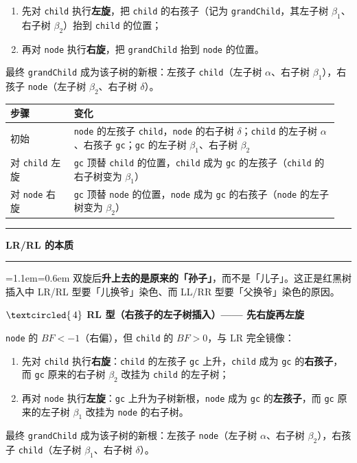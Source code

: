 \documentclass[11pt,openany,UTF8]{ctexbook}
\newcommand{\circled}[1]{\textcircled{\scriptsize\,#1}}
\newcommand{\callouthead}[2]{%
  \par\addvspace{7pt}\noindent
  {\color{#1}\rule[-0.15em]{3pt}{1.05em}}\hspace{0.5em}%
  {\bfseries\color{#1}#2}\par\nobreak\vspace{-0.35em}%
  {\color{rulesep}\hrule height 0.4pt}\nobreak\vspace{0.45em}%
  \begingroup\small\setlength{\parindent}{0pt}%
  \leftskip=1.1em\rightskip=0.6em\noindent\ignorespaces}
\newcommand{\calloutend}{\par\endgroup\addvspace{7pt}}
\newenvironment{callkey}[1]{\callouthead{keybar}{#1}}{\calloutend}
\begin{document}
\begin{enumerate}
\item 先对 \texttt{child} 执行\textbf{左旋}，把 \texttt{child} 的右孩子（记为 \texttt{grandChild}，其左子树 $\beta_1$、右子树 $\beta_2$）抬到 \texttt{child} 的位置；
\item 再对 \texttt{node} 执行\textbf{右旋}，把 \texttt{grandChild} 抬到 \texttt{node} 的位置。
\end{enumerate}
最终 \texttt{grandChild} 成为该子树的新根：左孩子 \texttt{child}（左子树 $\alpha$、右子树 $\beta_1$），右孩子 \texttt{node}（左子树 $\beta_2$、右子树 $\delta$）。

\begingroup\small\setlength{\tabcolsep}{4.0pt}
\begin{longtable}{@{}L{0.1883\linewidth}L{0.7574\linewidth}@{}}
\toprule
\textbf{步骤} & \textbf{变化} \\
\midrule
\endhead
初始 & \texttt{node} 的左孩子 \texttt{child}，\texttt{node} 的右子树 $\delta$；\texttt{child} 的左子树 $\alpha$、右孩子 \texttt{gc}；\texttt{gc} 的左子树 $\beta_1$、右子树 $\beta_2$ \\
对 \texttt{child} 左旋 & \texttt{gc} 顶替 \texttt{child} 的位置，\texttt{child} 成为 \texttt{gc} 的左孩子（\texttt{child} 的右子树变为 $\beta_1$） \\
对 \texttt{node} 右旋 & \texttt{gc} 顶替 \texttt{node} 的位置，\texttt{node} 成为 \texttt{gc} 的右孩子（\texttt{node} 的左子树变为 $\beta_2$） \\
\bottomrule
\end{longtable}
\endgroup

\begin{callkey}{LR/RL 的本质}
双旋后\textbf{升上去的是原来的「孙子」}，而不是「儿子」。这正是红黑树插入中 LR/RL 型要「儿换爷」染色、而 LL/RR 型要「父换爷」染色的原因。

\end{callkey}

\textbf{$\circled{4}$ RL 型（右孩子的左子树插入）—— 先右旋再左旋}

\texttt{node} 的 $BF<-1$（右偏），但 \texttt{child} 的 $BF>0$，与 LR 完全镜像：

\begin{enumerate}
\item 先对 \texttt{child} 执行\textbf{右旋}：\texttt{child} 的左孩子 \texttt{gc} 上升，\texttt{child} 成为 \texttt{gc} 的\textbf{右孩子}，而 \texttt{gc} 原来的右子树 $\beta_2$ 改挂为 \texttt{child} 的左子树；
\item 再对 \texttt{node} 执行\textbf{左旋}：\texttt{gc} 上升为子树新根，\texttt{node} 成为 \texttt{gc} 的\textbf{左孩子}，而 \texttt{gc} 原来的左子树 $\beta_1$ 改挂为 \texttt{node} 的右子树。
\end{enumerate}
最终 \texttt{grandChild} 成为该子树的新根：左孩子 \texttt{node}（左子树 $\alpha$、右子树 $\beta_2$），右孩子 \texttt{child}（左子树 $\beta_1$、右子树 $\delta$）。
\end{document}
